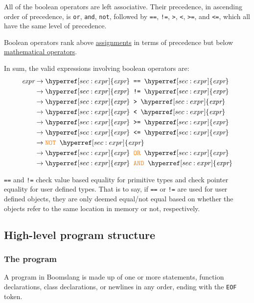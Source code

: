 \documentclass{article}
\begin{document}
All of the boolean operators are left associative. Their precedence, in ascending order of precedence, is \texttt{or}, \texttt{and}, \texttt{not}, followed by \texttt{==}, \texttt{!=}, \texttt{>}, \texttt{<}, \texttt{>=}, and \texttt{<=}, which all have the same level of precedence.

Boolean operators rank above \hyperref[sec:assigns]{assignments} in terms of precedence but below \hyperref[sec:expr-mathematical-operators]{mathematical operators}.

In sum, the valid expressions involving boolean operators are:
\begin{align*}
    \textit{expr} &\to \hyperref[sec:expr]{\textit{expr}} \texttt{ == } \hyperref[sec:expr]{\textit{expr}} \\
    &\to \hyperref[sec:expr]{\textit{expr}} \texttt{ != } \hyperref[sec:expr]{\textit{expr}} \\
    &\to \hyperref[sec:expr]{\textit{expr}} \texttt{ > } \hyperref[sec:expr]{\textit{expr}} \\
    &\to \hyperref[sec:expr]{\textit{expr}} \texttt{ < } \hyperref[sec:expr]{\textit{expr}} \\
    &\to \hyperref[sec:expr]{\textit{expr}} \texttt{ >= } \hyperref[sec:expr]{\textit{expr}} \\
    &\to \hyperref[sec:expr]{\textit{expr}} \texttt{ <= } \hyperref[sec:expr]{\textit{expr}} \\
    &\to \textcolor{orange}{\texttt{NOT}} \texttt{ } \hyperref[sec:expr]{\textit{expr}} \\
    &\to \hyperref[sec:expr]{\textit{expr}} \textcolor{orange}{\texttt{ OR }} \hyperref[sec:expr]{\textit{expr}} \\
    &\to \hyperref[sec:expr]{\textit{expr}} \textcolor{orange}{\texttt{ AND }} \hyperref[sec:expr]{\textit{expr}} \\
\end{align*}

\texttt{==} and \texttt{!=} check value based equality for primitive types and check pointer equality for user defined types. That is to say, if \texttt{==} or \texttt{!=} are used for user defined objects, they are only deemed equal/not equal based on whether the objects refer to the same location in memory or not, respectively.

\subsection{High-level program structure}
\subsubsection{The program}
A program in Boomslang is made up of one or more statements, function declarations, class declarations, or newlines in any order, ending with the \texttt{EOF} token.
\end{document}
